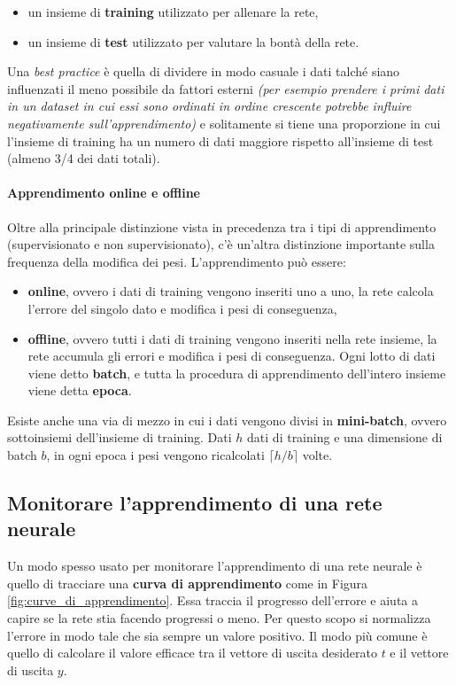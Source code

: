 \documentclass[12pt, twoside, letterpaper]{report}
\begin{document}
			\begin{itemize}
				\item un insieme di \textbf{training} utilizzato per allenare la rete,
				\item un insieme di \textbf{test} utilizzato per valutare la bontà della rete.
			\end{itemize}
			Una \textit{best practice} è quella di dividere in modo casuale i dati talché siano influenzati il meno possibile da fattori esterni \textit{(per esempio prendere i primi dati in un dataset in cui essi sono ordinati in ordine crescente potrebbe influire negativamente sull'apprendimento)} e solitamente si tiene una proporzione in cui l'insieme di training ha un numero di dati maggiore rispetto all'insieme di test (almeno 3/4 dei dati totali). 

			\paragraph{Apprendimento online e offline} Oltre alla principale distinzione vista in precedenza tra i tipi di apprendimento (supervisionato e non supervisionato), c'è un'altra distinzione importante sulla frequenza della modifica dei pesi. L'apprendimento può essere: 
				\begin{itemize}
					\item \textbf{online}, ovvero i dati di training vengono inseriti uno a uno, la rete calcola l'errore del singolo dato e modifica i pesi di conseguenza,
					\item \textbf{offline}, ovvero tutti i dati di training vengono inseriti nella rete insieme, la rete accumula gli errori e modifica i pesi di conseguenza. Ogni lotto di dati viene detto \textbf{batch}, e tutta la procedura di apprendimento dell'intero insieme viene detta \textbf{epoca}.
				\end{itemize}
				Esiste anche una via di mezzo in cui i dati vengono divisi in \textbf{mini-batch}, ovvero sottoinsiemi dell'insieme di training. Dati $h$ dati di training e una dimensione di batch $b$, in ogni epoca i pesi vengono ricalcolati $\lceil h/b \rceil$ volte.
			
			\subsection{Monitorare l'apprendimento di una rete neurale} \label{sec:monitor_appr}
				Un modo spesso usato per monitorare l'apprendimento di una rete neurale è quello di tracciare una \textbf{curva di apprendimento} come in Figura \ref{fig:curve_di_apprendimento}. Essa traccia il progresso dell'errore e aiuta a capire se la rete stia facendo progressi o meno. Per questo scopo si normalizza l'errore in modo tale che sia sempre un valore positivo. Il modo più comune è quello di calcolare il valore efficace tra il vettore di uscita desiderato $t$ e il vettore di uscita $y$. 
\end{document}
